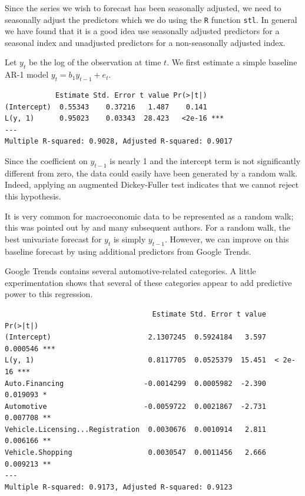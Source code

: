 \documentclass[12pt, oneside]{article}
\begin{document}
Since the series we wish to forecast has been seasonally adjusted, we
need to seasonally adjust the predictors which we do using the
{\tt R} function {\tt stl}.  In general we have found that it is a
good idea use seasonally adjusted predictors for a seasonal index and
unadjusted predictors for a non-seasonally adjusted index.

Let $y_t$ be the log of the observation at time $t$.  We first
estimate a simple baseline AR-1 model $y_t =  b_1y_{t-1} + e_t$.
\small
\begin{verbatim}
            Estimate Std. Error t value Pr(>|t|)    
(Intercept)  0.55343    0.37216   1.487    0.141    
L(y, 1)      0.95023    0.03343  28.423   <2e-16 ***
---
Multiple R-squared: 0.9028,	Adjusted R-squared: 0.9017 
\end{verbatim}
\normalsize


Since the coefficient on $y_{t-1}$ is nearly 1 and the intercept term
is not significantly different from zero, the data could easily have
been generated by a random walk.  Indeed, applying an augmented
Dickey-Fuller test indicates that we cannot reject this hypothesis.

It is very common for macroeconomic data to be represented as a random
walk; this was pointed out by \cite{Nelson82} and many subsequent
authors.  For a random walk, the best univariate forecast for $y_t$ is
simply $y_{t-1}$.  However, we can improve on this baseline forecast
by using additional predictors from Google Trends.

Google Trends contains several automotive-related categories.  A
little experimentation shows that several of these categories appear
to add predictive power to this regression.

\small
\begin{verbatim}
                                   Estimate Std. Error t value Pr(>|t|)    
(Intercept)                       2.1307245  0.5924184   3.597 0.000546 ***
L(y, 1)                           0.8117705  0.0525379  15.451  < 2e-16 ***
Auto.Financing                   -0.0014299  0.0005982  -2.390 0.019093 *  
Automotive                       -0.0059722  0.0021867  -2.731 0.007708 ** 
Vehicle.Licensing...Registration  0.0030676  0.0010914   2.811 0.006166 ** 
Vehicle.Shopping                  0.0030547  0.0011456   2.666 0.009213 ** 
---
Multiple R-squared: 0.9173,	Adjusted R-squared: 0.9123 
\end{verbatim}
\normalsize
\end{document}
